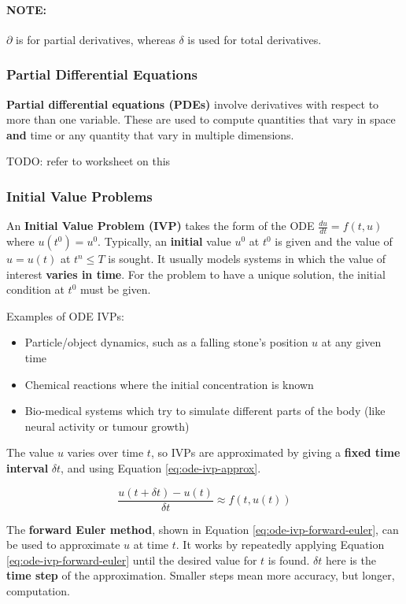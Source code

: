 \documentclass{article}
\begin{document}
\paragraph{\textbf{NOTE: }} $\partial$ is for partial derivatives, whereas $\delta$ is used for total derivatives.

\subsubsection{Partial Differential Equations}

\textbf{Partial differential equations (PDEs)} involve derivatives with respect to more than one variable. These are used to compute quantities that vary in space \textbf{and} time or any quantity that vary in multiple dimensions.

TODO: refer to worksheet on this

\subsubsection{Initial Value Problems}

An \textbf{Initial Value Problem (IVP)} takes the form of the ODE $\frac{du}{dt} = f(t, u)$ where $u(t^0) = u^0$. Typically, an \textbf{initial} value $u^0$ at $t^0$ is given and the value of $u = u(t)$ at $t^n \leq T$ is sought. It usually models systems in which the value of interest \textbf{varies in time}. For the problem to have a unique solution, the initial condition at $t^0$ must be given.

Examples of ODE IVPs:
\begin{itemize}
	\item Particle/object dynamics, such as a falling stone's position $u$ at any given time
	\item Chemical reactions where the initial concentration is known
	\item Bio-medical systems which try to simulate different parts of the body (like neural activity or tumour growth)
\end{itemize}

The value $u$ varies over time $t$, so IVPs are approximated by giving a \textbf{fixed time interval} $\delta t$, and using Equation \ref{eq:ode-ivp-approx}.

\begin{equation}
	\frac{u(t + \delta t) - u(t)}{\delta t} \approx f(t, u(t))
	\label{eq:ode-ivp-approx}
\end{equation}

The \textbf{forward Euler method}, shown in Equation \ref{eq:ode-ivp-forward-euler}, can be used to approximate $u$ at time $t$. It works by repeatedly applying Equation \ref{eq:ode-ivp-forward-euler} until the desired value for $t$ is found. $\delta t$ here is the \textbf{time step} of the approximation. Smaller steps mean more accuracy, but longer, computation.
\end{document}
